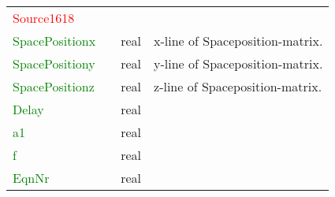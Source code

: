 \documentclass[12pt,twoside]{article}
\begin{document}
\begin{table}[H]
\begin{center}
\begin{tabular}{|p{4cm}|p{2.7cm}|p{2cm}|p{4cm}|}
\textcolor{red}{Source1618} & & &\\
\textcolor{green}{SpacePositionx} &  & real & x-line of Spaceposition-matrix.  \\
\textcolor{green}{SpacePositiony} &  & real & y-line of Spaceposition-matrix. \\
\textcolor{green}{SpacePositionz} &  & real & z-line of Spaceposition-matrix. \\
\textcolor{green}{Delay} &  & real & \\
\textcolor{green}{a1} &  & real & \\
\textcolor{green}{f} &  & real & \\
\textcolor{green}{EqnNr} &  & real & \\
\hline
% 

\end{tabular}
\end{center}
\end{table}
\end{document}
